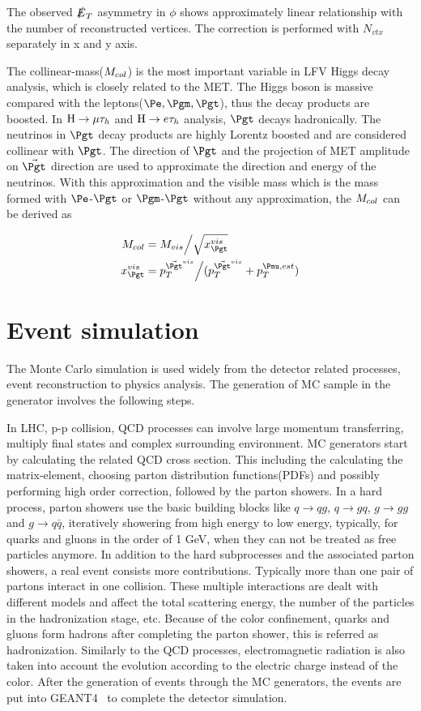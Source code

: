 The observed $\slashed{E}_{T}$ asymmetry in $\phi$ shows approximately linear relationship with the number of reconstructed vertices. The correction is performed with $N_{vtx}$ separately in x and y axis. 

The collinear-mass($M_{col}$) is the most important variable in LFV Higgs decay analysis, which is closely related to the MET. The Higgs boson is massive compared with the leptons($\Pe,\Pgm,\Pgt$), thus the decay products are boosted. In $\mathrm{H}\to \mu\tau_{h}$ and $\mathrm{H} \to e \tau_{h}$ analysis, $\Pgt$ decays hadronically. The neutrinos in $\Pgt$ decay products are highly Lorentz boosted and are considered collinear with $\Pgt$. The direction of $\Pgt$ and the projection of MET amplitude on $\vec{\Pgt}$ direction are used to approximate the direction and energy of the neutrinos. With this approximation and the visible mass which is the mass formed with $\Pe$-$\Pgt$ or $\Pgm$-$\Pgt$ without any approximation, the $M_{col}$ can be derived as

\begin{align*}
\mcol&=M_{vis}\Big/\sqrt{x^{vis}_{\Pgt}}\\
x^{vis}_{\Pgt}&=p_{T}^{\vec{\Pgt}^{vis}}\Big/(p_{T}^{\vec{\Pgt}^{vis}}+p_{T}^{\Pnu,est})
\end{align*}

\section{Event simulation}
The Monte Carlo simulation is used widely from the detector related processes, event reconstruction to physics analysis. The generation of MC sample in the generator involves the following steps. 

In LHC, p-p collision, QCD processes can involve large momentum transferring, multiply final states and complex surrounding environment. MC generators start by calculating the related QCD cross section. This including the calculating the matrix-element, choosing parton distribution functions(PDFs) and possibly performing high order correction, followed by the parton showers. In a hard process, parton showers use the basic building blocks like $q\rightarrow qg$, $q\rightarrow gq$, $g\rightarrow gg$ and $g\rightarrow q\bar{q}$, iteratively showering from high energy to low energy, typically, for quarks and gluons in the order of 1 GeV, when they can not be treated as free particles anymore. In addition to the hard subprocesses and the associated parton showers, a real event consists more contributions. Typically more than one pair of partons interact in one collision. These multiple interactions are dealt with different models and affect the total scattering energy, the number of the particles in the hadronization stage, etc. Because of the color confinement, quarks and gluons form hadrons after completing the parton shower, this is referred as hadronization. Similarly to the QCD processes, electromagnetic radiation is also taken into account the evolution according to the electric charge instead of the color. After the generation of events through the MC generators, the events are put into GEANT4~\cite{GEANT4} to complete the detector simulation.



